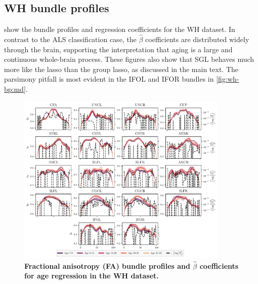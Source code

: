 \documentclass[10pt,letterpaper]{article}
\begin{document}
\subsection{WH bundle profiles}

 show the bundle profiles and regression
coefficients for the WH dataset. In contrast to the ALS classification case,
the $\hat{\beta}$ coefficients are distributed widely through the brain, supporting
the interpretation that aging is a large and continuous whole-brain process.
These figures also show that SGL behaves much more like the lasso than the group
lasso, as discussed in the main text. The parsimony pitfall is most evident in
the IFOL and IFOR bundles in \cref{fig:wh-bp:md}.

\begin{figure}
    \includegraphics[width=0.9\textwidth]{wh_coefs_profiles_fa.pdf}
    \caption{%
        {%
            \bf Fractional anisotropy (FA) bundle profiles and $\hat{\beta}$
            coefficients for age regression in the WH dataset.
        }
        \label{fig:wh-bp:fa}
    }
\end{figure}
\end{document}
